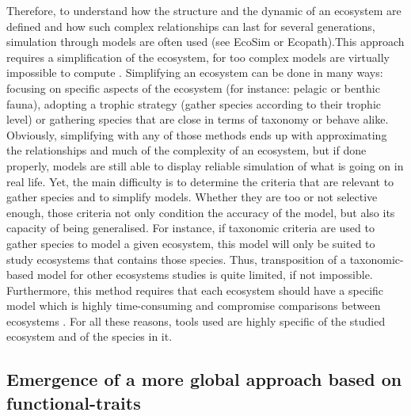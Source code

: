 \documentclass[a4paper, 12pt]{article}
\begin{document}
Therefore, to understand how the structure and the dynamic of an ecosystem are defined and how such complex relationships can last for several generations, simulation through models are often used (see EcoSim or Ecopath).This approach requires a simplification of the ecosystem, for too complex models are virtually impossible to compute \citep{albouy2011}. Simplifying an ecosystem can be done in many ways: focusing on specific aspects of the ecosystem (for instance: pelagic or benthic fauna), adopting a trophic strategy (gather species according to their trophic level) or gathering species that are close in terms of taxonomy or behave alike. Obviously, simplifying with any of those methods ends up with approximating the relationships and much of the complexity of an ecosystem, but if done properly, models are still able to display reliable simulation of what is going on in real life. Yet, the main difficulty is to determine the criteria that are relevant to gather species and to simplify models. Whether they are too or not selective enough, those criteria not only condition the accuracy of the model, but also its capacity of being generalised. For instance, if taxonomic criteria are used to gather species to model a given ecosystem, this model will only be suited to study ecosystems that contains those species. Thus, transposition of a taxonomic-based model for other ecosystems studies is quite limited, if not impossible. Furthermore, this method requires that each ecosystem should have a specific model which is highly time-consuming and compromise comparisons between ecosystems \citep{martini2020,mcgill2006}. For all these reasons, tools used are highly specific of the studied ecosystem and of the species in it. \\


\subsection{Emergence of a more global approach based on functional-traits}
\end{document}
